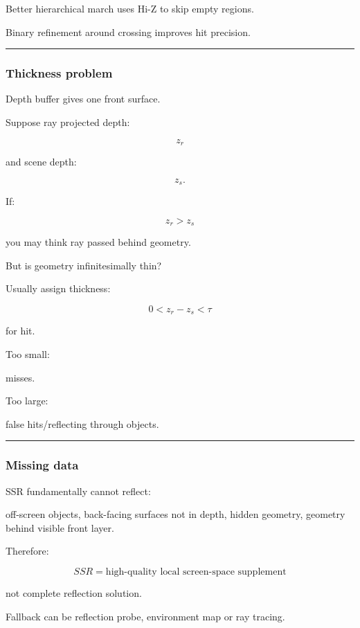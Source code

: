 Better hierarchical march uses Hi-Z to skip empty regions.

Binary refinement around crossing improves hit precision.

\begin{center}\rule{0.5\linewidth}{0.5pt}\end{center}

\subsubsection{Thickness problem}\label{thickness-problem}

Depth buffer gives one front surface.

Suppose ray projected depth:

\[
z_r
\]

and scene depth:

\[
z_s.
\]

If:

\[
z_r>z_s
\]

you may think ray passed behind geometry.

But is geometry infinitesimally thin?

Usually assign thickness:

\[
0<
z_r-z_s
<
\tau
\]

for hit.

Too small:

misses.

Too large:

false hits/reflecting through objects.

\begin{center}\rule{0.5\linewidth}{0.5pt}\end{center}

\subsubsection{Missing data}\label{missing-data}

SSR fundamentally cannot reflect:

off-screen objects, back-facing surfaces not in depth, hidden geometry, geometry behind visible front layer.

Therefore:

\[
\boxed{
SSR
=
\text{high-quality local screen-space supplement}
}
\]

not complete reflection solution.

Fallback can be reflection probe, environment map or ray tracing.

